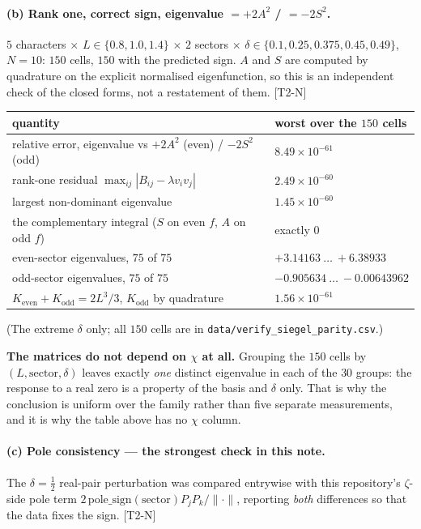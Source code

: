 \documentclass[11pt,a4paper]{article}
\theoremstyle{remark}
\newcommand{\tier}[1]{{\small\textsf{[#1]}}}
\newcommand{\src}[1]{{\footnotesize\texttt{#1}}}
\begin{document}
\paragraph{(b) Rank one, correct sign, eigenvalue $=+2A^2$ / $=-2S^2$.}
$5$ characters $\times$ $L\in\{0.8,1.0,1.4\}$ $\times$ $2$ sectors $\times$
$\delta\in\{0.1,0.25,0.375,0.45,0.49\}$, $N=10$: $150$ cells, $150$ with the predicted
sign. $A$ and $S$ are computed by quadrature on the explicit normalised eigenfunction, so
this is an independent check of the closed forms, not a restatement of them. \tier{T2-N}

\begin{center}\small
\begin{tabular}{@{}ll@{}}
\toprule
quantity & worst over the $150$ cells \\
\midrule
relative error, eigenvalue vs $+2A^2$ (even) / $-2S^2$ (odd) & $8.49\times10^{-61}$ \\
rank-one residual $\max_{ij}|B_{ij}-\lambda v_iv_j|$ & $2.49\times10^{-60}$ \\
largest non-dominant eigenvalue & $1.45\times10^{-60}$ \\
the complementary integral ($S$ on even $f$, $A$ on odd $f$) & exactly $0$ \\
even-sector eigenvalues, $75$ of $75$ & $+3.14163\ \ldots\ +6.38933$ \\
odd-sector eigenvalues, $75$ of $75$ & $-0.905634\ \ldots\ -0.00643962$ \\
$K_{\mathrm{even}}+K_{\mathrm{odd}}=2L^3/3$, $K_{\mathrm{odd}}$ by quadrature & $1.56\times10^{-61}$ \\
\bottomrule
\end{tabular}
\end{center}



\noindent (The extreme $\delta$ only; all $150$ cells are in
\src{data/verify\_siegel\_parity.csv}.)

\noindent\textbf{The matrices do not depend on $\chi$ at all.} Grouping the $150$ cells by
$(L,\text{sector},\delta)$ leaves exactly \emph{one} distinct eigenvalue in each of the
$30$ groups: the response to a real zero is a property of the basis and $\delta$ only. That
is why the conclusion is uniform over the family rather than five separate measurements,
and it is why the table above has no $\chi$ column.

\paragraph{(c) Pole consistency --- the strongest check in this note.}
The $\delta=\tfrac12$ real-pair perturbation was compared entrywise with this repository's
$\zeta$-side pole term $2\,\mathrm{pole\_sign}(\text{sector})P_jP_k/\|\cdot\|$, reporting
\emph{both} differences so that the data fixes the sign. \tier{T2-N}
\end{document}
